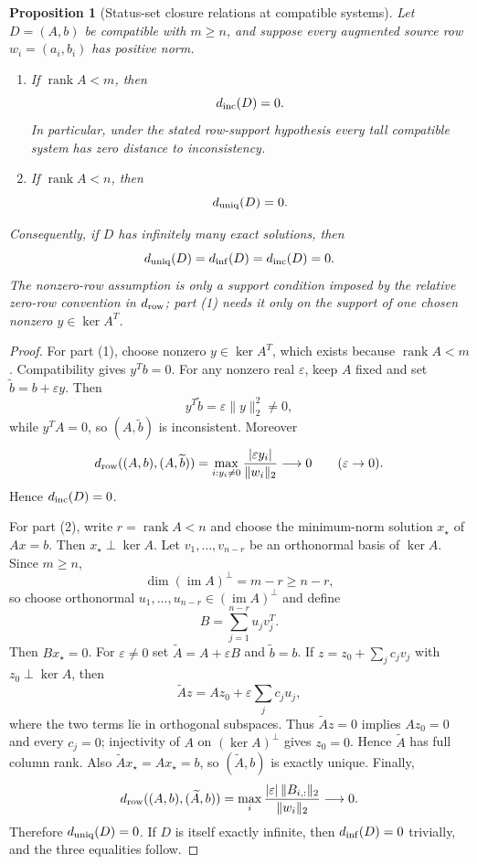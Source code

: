\documentclass[11pt]{article}
\newtheorem{proposition}[theorem]{Proposition}
\theoremstyle{definition}
\newcommand{\rank}{\operatorname{rank}}
\begin{document}
\begin{proposition}[Status-set closure relations at compatible systems]\label{prop:status-closures}
Let $D=(A,b)$ be compatible with $m\ge n$, and suppose every augmented source row $w_i=(a_i,b_i)$ has positive norm.
\begin{enumerate}
\item If $\rank A<m$, then
\[
d_{\rm inc}(D)=0.
\]
In particular, under the stated row-support hypothesis every tall compatible system has zero distance to inconsistency.
\item If $\rank A<n$, then
\[
d_{\rm uniq}(D)=0.
\]
\end{enumerate}
Consequently, if $D$ has infinitely many exact solutions, then
\[
d_{\rm uniq}(D)=d_{\rm inf}(D)=d_{\rm inc}(D)=0.
\]
The nonzero-row assumption is only a support condition imposed by the relative zero-row convention in $d_{\rm row}$; part (1) needs it only on the support of one chosen nonzero $y\in\ker A^T$.
\end{proposition}

\begin{proof}
For part (1), choose nonzero $y\in\ker A^T$, which exists because $\rank A<m$. Compatibility gives $y^Tb=0$. For any nonzero real $\varepsilon$, keep $A$ fixed and set $\widetilde b=b+\varepsilon y$. Then
\[
y^T\widetilde b=\varepsilon\|y\|_2^2\ne0,
\]
while $y^TA=0$, so $(A,\widetilde b)$ is inconsistent. Moreover
\[
d_{\rm row}((A,b),(A,\widetilde b))
=\max_{i:y_i\ne0}\frac{|\varepsilon y_i|}{\|w_i\|_2}\longrightarrow0
\qquad(\varepsilon\to0).
\]
Hence $d_{\rm inc}(D)=0$.

For part (2), write $r=\rank A<n$ and choose the minimum-norm solution $x_\star$ of $Ax=b$. Then $x_\star\perp\ker A$. Let $v_1,\ldots,v_{n-r}$ be an orthonormal basis of $\ker A$. Since $m\ge n$,
\[
\dim(\operatorname{im}A)^\perp=m-r\ge n-r,
\]
so choose orthonormal $u_1,\ldots,u_{n-r}\in(\operatorname{im}A)^\perp$ and define
\[
B=\sum_{j=1}^{n-r}u_jv_j^T.
\]
Then $Bx_\star=0$. For $\varepsilon\ne0$ set $\widetilde A=A+\varepsilon B$ and $\widetilde b=b$. If $z=z_0+\sum_j c_jv_j$ with $z_0\perp\ker A$, then
\[
\widetilde A z=Az_0+\varepsilon\sum_j c_ju_j,
\]
where the two terms lie in orthogonal subspaces. Thus $\widetilde A z=0$ implies $Az_0=0$ and every $c_j=0$; injectivity of $A$ on $(\ker A)^\perp$ gives $z_0=0$. Hence $\widetilde A$ has full column rank. Also $\widetilde A x_\star=Ax_\star=b$, so $(\widetilde A,b)$ is exactly unique. Finally,
\[
d_{\rm row}((A,b),(\widetilde A,b))
=\max_i\frac{|\varepsilon|\,\|B_{i,:}\|_2}{\|w_i\|_2}\longrightarrow0.
\]
Therefore $d_{\rm uniq}(D)=0$. If $D$ is itself exactly infinite, then $d_{\rm inf}(D)=0$ trivially, and the three equalities follow.
\end{proof}
\end{document}
